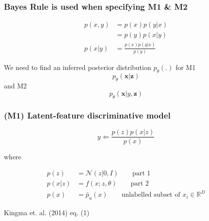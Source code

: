\documentclass{beamer}
\begin{document}
\begin{frame}
  \frametitle{Bayes Rule is used when specifying M1 \& M2}

  \begin{align*}
    p(x,y) &= p(x)p(y|x) \\
    &= p(y)p(x|y) \\
    p(x|y) &= \frac{p(x)p(y|x)}{p(y)}
  \end{align*}

  We need to find an inferred posterior distribution $p_\theta (.)$ \newline
  for M1 \footnotemark
  \[p_\theta (\mathbf{x}|\mathbf{z})\] and
  M2 \footnotemark \[p_\theta (\mathbf{x}|y, \mathbf{z})\]


  
\end{frame}

\begin{frame}
  \frametitle{(M1) Latent-feature discriminative model}

  \[
  y \Leftarrow   \frac{p(z)p(x|z)}{p(x)}
  \]

  where

  \begin{align*}
    p(z) &= \mathcal{N}(z|0,I) \qquad \text{part 1}\\
    p(x|z) &= f(x;z,\theta) \qquad \text{part 2} \\
    p(x) &= \tilde{p_u}(x) \qquad \text{unlabelled subset of $x_i \in \mathbb{R}^D$}
    \end{align*}

  

  Kingma et. al. (2014) eq. (1)
  \end{frame}
 
\end{document}

